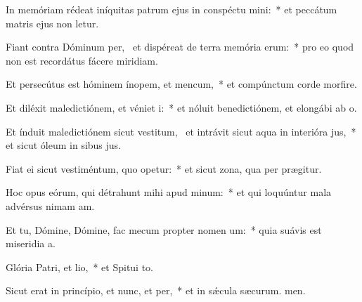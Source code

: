 \item In memóriam rédeat iníquitas patrum ejus in conspéctu mini:~* et peccátum matris ejus non letur.
\item Fiant contra Dóminum per,~\pscross{} et dispéreat de terra memória erum:~* pro eo quod non est recordátus fácere miridiam.
\item Et persecútus est hóminem ínopem, et mencum,~* et compúnctum corde morfire.
\item Et diléxit maledictiónem, et véniet i:~* et nóluit benedictiónem, et elongábi ab o.
\item Et índuit maledictiónem sicut vestitum,~\pscross{} et intrávit sicut aqua in interióra jus,~* et sicut óleum in sibus jus.
\item Fiat ei sicut vestiméntum, quo opetur:~* et sicut zona, qua per prægitur.
\item Hoc opus eórum, qui détrahunt mihi apud minum:~* et qui loquúntur mala advérsus nimam am.
\item Et tu, Dómine, Dómine, fac mecum propter nomen um:~* quia suávis est miseridia a.
\item Glória Patri, et lio,~* et Spitui to.
\item Sicut erat in princípio, et nunc, et per,~* et in sǽcula sæcurum. men.
